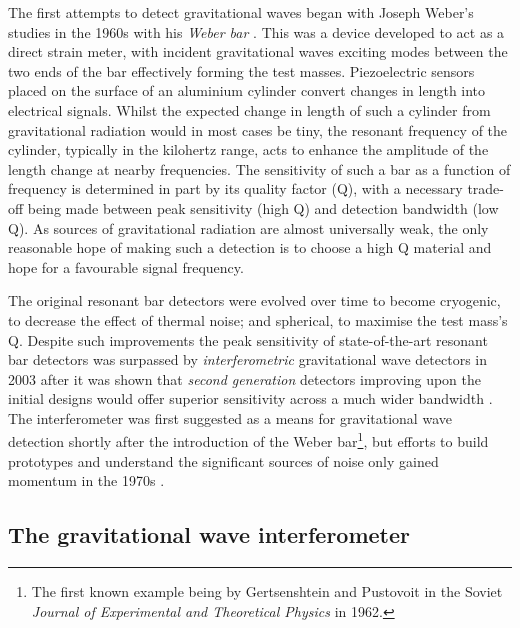 The first attempts to detect gravitational waves began with Joseph Weber's studies in the 1960s with his \emph{Weber bar} \cite{Weber1960}. This was a device developed to act as a direct strain meter, with incident gravitational waves exciting modes between the two ends of the bar effectively forming the test masses. Piezoelectric sensors placed on the surface of an aluminium cylinder convert changes in length into electrical signals. Whilst the expected change in length of such a cylinder from gravitational radiation would in most cases be tiny, the resonant frequency of the cylinder, typically in the kilohertz range, acts to enhance the amplitude of the length change at nearby frequencies. The sensitivity of such a bar as a function of frequency is determined in part by its quality factor (Q), with a necessary trade-off being made between peak sensitivity (high Q) and detection bandwidth (low Q). As sources of gravitational radiation are almost universally weak, the only reasonable hope of making such a detection is to choose a high Q material and hope for a favourable signal frequency.

The original resonant bar detectors were evolved over time to become cryogenic, to decrease the effect of thermal noise; and spherical, to maximise the test mass's Q. Despite such improvements the peak sensitivity of state-of-the-art resonant bar detectors was surpassed by \emph{interferometric} gravitational wave detectors in 2003 \cite{Pitkin2011} after it was shown that \emph{second generation} detectors improving upon the initial designs would offer superior sensitivity across a much wider bandwidth \cite{Harry2002a}. The interferometer was first suggested as a means for gravitational wave detection shortly after the introduction of the Weber bar\footnote{The first known example being by Gertsenshtein and Pustovoit in the Soviet \emph{Journal of Experimental and Theoretical Physics} in 1962.}, but efforts to build prototypes and understand the significant sources of noise only gained momentum in the 1970s \cite{Moss1971, Weiss1972}.

\subsection{\label{sec:gw-interferometry}The gravitational wave interferometer}

